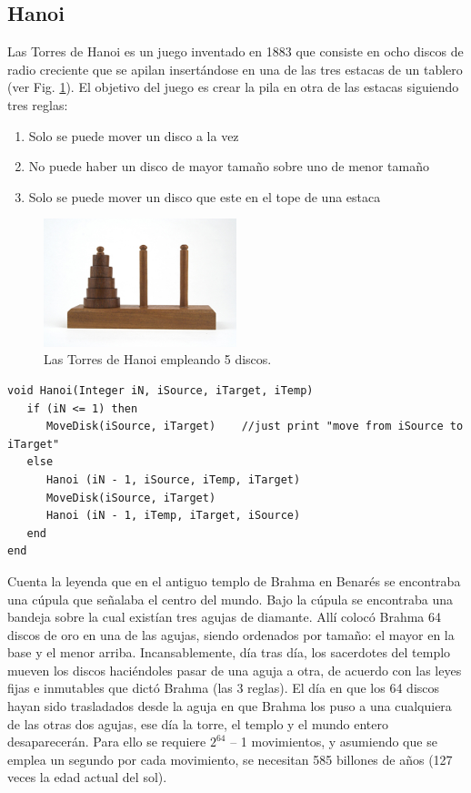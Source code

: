 \subsection{Hanoi}
	Las Torres de Hanoi es un juego inventado en 1883 que consiste en ocho discos de radio creciente que se apilan insertándose en una de las tres estacas de un tablero (ver Fig. \ref{fig:Ch1hanoi}). El objetivo del juego es crear la pila en otra de las estacas siguiendo tres reglas:
\begin{enumerate}
\item Solo se puede mover un disco a la vez
\item No puede haber un disco de mayor tamaño sobre uno de menor tamaño
\item Solo se puede mover un disco que este en el tope de una estaca
\end{enumerate}

\begin{figure}[htpb!]
  \begin{center}
    \includegraphics[width=0.5\textwidth]{images/hanoi.jpg}
  \end{center}
  \caption{Las Torres de Hanoi empleando 5 discos.}
  \label{fig:Ch1hanoi}
\end{figure}

\begin{lstlisting}[upquote=true, language=pseudo]
void Hanoi(Integer iN, iSource, iTarget, iTemp)
   if (iN <= 1) then
      MoveDisk(iSource, iTarget)	//just print "move from iSource to iTarget"
   else
      Hanoi (iN - 1, iSource, iTemp, iTarget)
      MoveDisk(iSource, iTarget)
      Hanoi (iN - 1, iTemp, iTarget, iSource)
   end
end
\end{lstlisting}

Cuenta la leyenda que en el antiguo templo de Brahma en Benarés se encontraba una cúpula que señalaba el centro del mundo. Bajo la cúpula se encontraba una bandeja sobre la cual existían tres agujas de diamante. Allí colocó Brahma 64 discos de oro en una de las agujas, siendo ordenados por tamaño: el mayor en la base y el menor arriba. Incansablemente, día tras día, los sacerdotes del templo mueven los discos haciéndoles pasar de una aguja a otra, de acuerdo con las leyes fijas e inmutables que dictó Brahma (las 3 reglas). El día en que los 64 discos hayan sido trasladados desde la aguja en que Brahma los puso a una cualquiera de las otras dos agujas, ese día la torre, el templo y el mundo entero desaparecerán. Para ello se requiere $2^{64}$ – 1 movimientos, y asumiendo que se emplea un segundo por cada movimiento, se necesitan 585 billones de años (127 veces la edad actual del sol).

